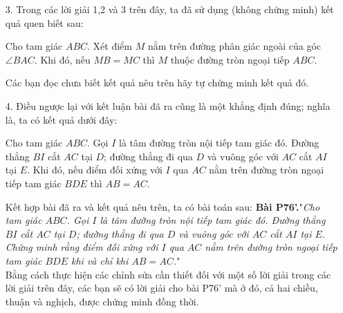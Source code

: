 \begin{bt}
{\begin{nx}
\begin{enumerate}
\begin{enumerate}
					\begin{center}
						$DI'=DI=EO$.
					\end{center}
					Suy ra, $DEOI'$ là hình thang cân. Vì thế, $4$ điểm $D,E,O,I'$ cùng thuộc một đường tròn. \hfill(4)\\
					Hơn nữa, ta có $ED=OI=OB$ và $OE\parallel BD$. Vì thế, $EOBD$ cũng là hình thang cân. Suy ra, $4$ điểm $E,O,B,D$ cùng thuộc một đường tròn.\hfill(5)\\
					Từ (4) và (5), suy ra $I'$ thuộc đường tròn $(BDE)$.
				\end{enumerate}
				\item[3.] Trong các lời giải 1,2 và 3 trên đây, ta đã sử dụng (không chứng minh) kết quả quen biết sau:
				\begin{bode}
					Cho tam giác $ABC$. Xét điểm $M$ nằm trên đường phân giác ngoài của góc $\angle BAC$. Khi đó, nếu $MB=MC$ thì $M$ thuộc đường tròn ngoại tiếp $ABC$.
				\end{bode}
				Các bạn đọc chưa biết kết quả nêu trên hãy tự chứng minh kết quả đó.
				\item[4.] Điều ngược lại với kết luận bài đã ra cũng là một khẳng định đúng; nghĩa là, ta có kết quả dưới đây:
				\begin{bode}
					Cho tam giác $ABC$. Gọi $I$ là tâm đường tròn nội tiếp tam giác đó. Đường thẳng $BI$ cắt $AC$ tại $D$; đường thẳng đi qua $D$ và vuông góc với $AC$ cắt $AI$ tại $E$. Khi đó, nếu điểm đối xứng với $I$ qua $AC$ nằm trên đường tròn ngoại tiếp tam giác $BDE$ thì $AB=AC$.
				\end{bode}
				Kết hợp bài đã ra và kết quả nêu trên, ta có bài toán sau:
				\textbf{Bài P76'.}"\textit{Cho tam giác $ABC$. Gọi $I$ là tâm đường tròn nội tiếp tam giác đó. Đường thẳng $BI$ cắt $AC$ tại $D$; đường thẳng đi qua $D$ và vuông góc với $AC$ cắt $AI$ tại $E$. Chứng minh rằng điểm đối xứng với $I$ qua $AC$ nằm trên đường tròn ngoại tiếp tam giác $BDE$ khi và chỉ khi $AB=AC$.}"\\
				Bằng cách thực hiện các chỉnh sửa cần thiết đối với một số lời giải trong các lời giải trên đây, các bạn sẽ có lời giải cho bài P76' mà ở đó, cả hai chiều, thuận và nghịch, được chứng minh đồng thời.
			\end{enumerate}
		\end{nx}
	}
\end{bt}
